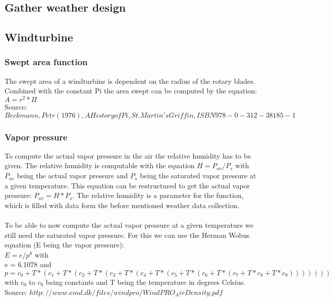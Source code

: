\subsection{Gather weather design}


\subsection{Windturbine}
\subsubsection{Swept area function}
The swept area of a windturbine is dependent on the radius of the rotary blades. Combined with the constant Pi the area swept can be computed by the equation: $A = r^{2}* \Pi $\\
Source: $Beckmann, Petr (1976), A History of Pi, St. Martin's Griffin, ISBN 978-0-312-38185-1$
\subsubsection{Vapor pressure}
To compute the actual vapor pressure in the air the relative humidity has to be given. The relative humidity is computable with the equation $H = P_{av} / P_s$ with $P_{av}$ being the actual vapor pressure and $P_s$ being the saturated vapor pressure at a given temperature. This equation can be restructured to get the actual vapor pressure: $P_{av}  = H * P_s$. The relative humidity is a parameter for the function, which is filled with data form the before mentioned weather data collection.\\
\\
To be able to now compute the actual vapor pressure at a given temperature we still need the saturated vapor pressure. For this we can use the Herman Wobus equation (E being the vapor pressure):\\
$E = e/p^{8}$ with\\
e = 6.1078 and\\
$p = c_0 + T * (c_1 + T * (c_2 + T * (c_3 + T * (c_4 + T *(c_5 + T * (c_6 + T * (c_7 + T * c_8 + T * c_9)))))))$\\
with $c_0$ to $c_9$ being constants and T being the temperature in degrees Celsius.\\
Source: $http://www.emd.dk/files/windpro/WindPRO_AirDensity.pdf$
